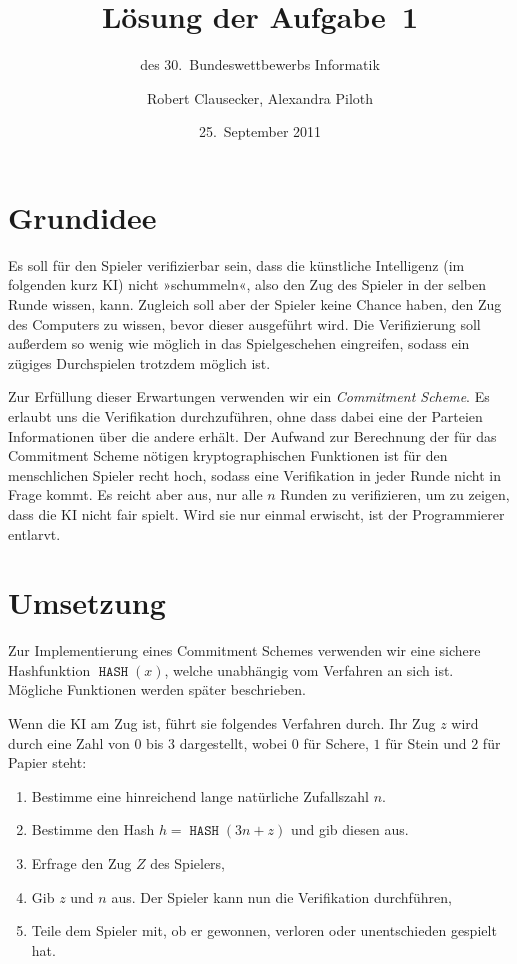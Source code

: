 \documentclass{scrartcl}
\title{Lösung der Aufgabe~1}
\subtitle{des 30.~Bundeswettbewerbs Informatik}
\author{Robert Clausecker, Alexandra Piloth}
\date{25.~September 2011}
\DeclareMathOperator{\hash}{\texttt{HASH}}
\begin{document}
\maketitle

\section{Grundidee}
Es soll für den Spieler verifizierbar sein, dass die künstliche Intelligenz (im
folgenden kurz KI) nicht »schummeln«, also den Zug des Spieler in der selben
Runde wissen, kann.  Zugleich soll aber der Spieler keine Chance haben, den Zug
des Computers zu wissen, bevor dieser ausgeführt wird.  Die Verifizierung soll
außerdem so wenig wie möglich in das Spielgeschehen eingreifen, sodass ein
zügiges Durchspielen trotzdem möglich ist.

Zur Erfüllung dieser Erwartungen verwenden wir ein \emph{Commitment Scheme}.  Es
erlaubt uns die Verifikation durchzuführen, ohne dass dabei eine der Parteien
Informationen über die andere erhält.  Der Aufwand zur Berechnung der für das
Commitment Scheme nötigen kryptographischen Funktionen ist für den menschlichen
Spieler recht hoch, sodass eine Verifikation in jeder Runde nicht in Frage
kommt.  Es reicht aber aus, nur alle $n$ Runden zu verifizieren, um zu zeigen,
dass die KI nicht fair spielt. Wird sie nur einmal erwischt, ist der
Programmierer entlarvt.

\section{Umsetzung}
Zur Implementierung eines Commitment Schemes verwenden wir eine sichere
Hashfunktion $\hash(x)$, welche unabhängig vom Verfahren an sich ist.  Mögliche
Funktionen werden später beschrieben.

Wenn die KI am Zug ist, führt sie folgendes Verfahren durch. Ihr Zug $z$ wird
durch eine Zahl von $0$ bis $3$ dargestellt, wobei $0$ für Schere, $1$ für Stein
und $2$ für Papier steht:
\begin{enumerate}
\item Bestimme eine hinreichend lange natürliche Zufallszahl $n$.
\item Bestimme den Hash $h = \hash(3n+z)$ und gib diesen aus.
\item Erfrage den Zug $Z$ des Spielers,
\item Gib $z$ und $n$ aus. Der Spieler kann nun die Verifikation durchführen,
\item Teile dem Spieler mit, ob er gewonnen, verloren oder unentschieden
  gespielt hat.
\end{enumerate}
\end{document}
